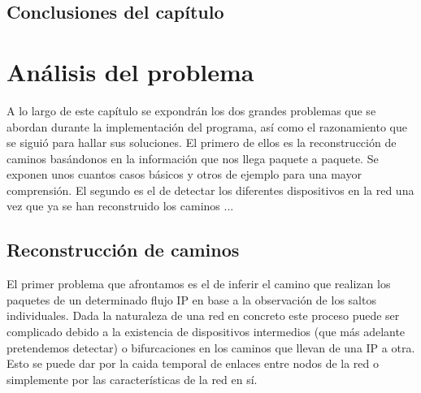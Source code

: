 \documentclass[twoside, 12pt]{epstfg}
\begin{document}
\section{Conclusiones del capítulo}

\chapter{Análisis del problema}
\label{chap:Analisis}
A lo largo de este capítulo se expondrán los dos grandes problemas que se abordan durante la implementación del programa, así como el razonamiento que se siguió para hallar sus soluciones. El primero de ellos es la reconstrucción de caminos basándonos en la información que nos llega paquete a paquete. Se exponen unos cuantos casos básicos y otros de ejemplo para una mayor comprensión. El segundo es el de detectar los diferentes dispositivos en la red una vez que ya se han reconstruido los caminos ...

\section{Reconstrucción de caminos}
El primer problema que afrontamos es el de inferir el camino que realizan los paquetes de un determinado flujo IP en base a la observación de los saltos individuales. Dada la naturaleza de una red en concreto este proceso puede ser complicado debido a la existencia de dispositivos intermedios (que más adelante pretendemos detectar) o bifurcaciones en los caminos que llevan de una IP a otra. Esto se puede dar por la caida temporal de enlaces entre nodos de la red o simplemente por las características de la red en sí.
\end{document}
